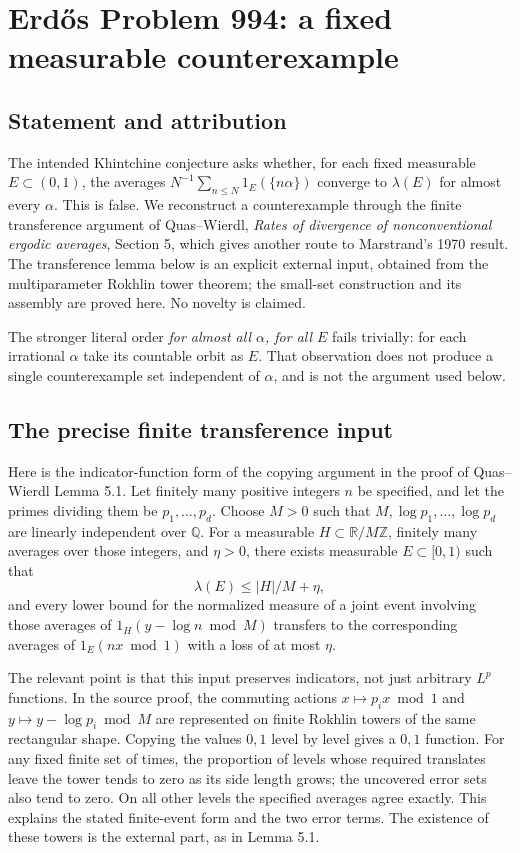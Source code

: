 \section*{Erd\H{o}s Problem 994: a fixed measurable counterexample}
\subsection*{Statement and attribution}
The intended Khintchine conjecture asks whether, for each fixed measurable $E\subset(0,1)$, the averages
$N^{-1}\sum_{n\le N}1_E(\{n\alpha\})$ converge to $\lambda(E)$ for almost every $\alpha$.
This is false. We reconstruct a counterexample through the finite transference argument of Quas--Wierdl, \emph{Rates of divergence of nonconventional ergodic averages}, Section 5, which gives another route to Marstrand's 1970 result.
The transference lemma below is an explicit external input, obtained from the multiparameter Rokhlin tower theorem; the small-set construction and its assembly are proved here. No novelty is claimed.

The stronger literal order \emph{for almost all $\alpha$, for all $E$} fails trivially: for each irrational $\alpha$ take its countable orbit as $E$. That observation does not produce a single counterexample set independent of $\alpha$, and is not the argument used below.

\subsection*{The precise finite transference input}
Here is the indicator-function form of the copying argument in the proof of Quas--Wierdl Lemma 5.1.
Let finitely many positive integers $n$ be specified, and let the primes dividing them be $p_1,\ldots,p_d$.
Choose $M>0$ such that
$M,\log p_1,\ldots,\log p_d$ are linearly independent over $\mathbb Q$.
For a measurable $H\subset\mathbb R/M\mathbb Z$, finitely many averages over those integers, and $\eta>0$, there exists measurable $E\subset[0,1)$ such that
\[
 \lambda(E)\le |H|/M+\eta,
\]
and every lower bound for the normalized measure of a joint event involving those averages of
$1_H(y-\log n\bmod M)$ transfers to the corresponding averages of
$1_E(nx\bmod1)$ with a loss of at most $\eta$.

The relevant point is that this input preserves indicators, not just arbitrary $L^p$ functions. In the source proof, the commuting actions $x\mapsto p_ix\bmod1$ and $y\mapsto y-\log p_i\bmod M$ are represented on finite Rokhlin towers of the same rectangular shape. Copying the values $0,1$ level by level gives a $0,1$ function. For any fixed finite set of times, the proportion of levels whose required translates leave the tower tends to zero as its side length grows; the uncovered error sets also tend to zero. On all other levels the specified averages agree exactly. This explains the stated finite-event form and the two error terms. The existence of these towers is the external part, as in Lemma 5.1.

